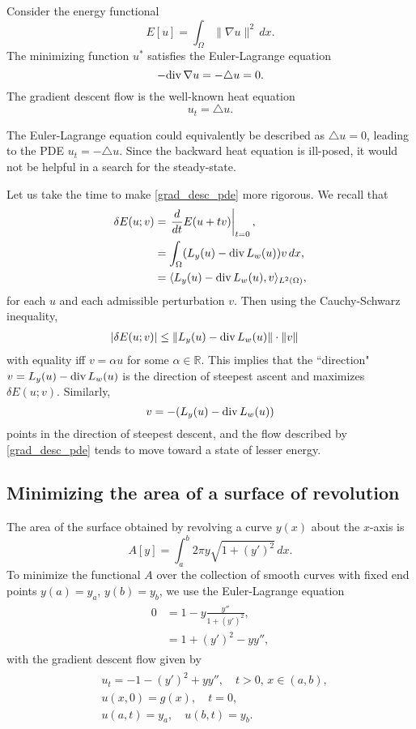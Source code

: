 \begin{example}
Consider the energy functional 
\[ E[u] = \int_{\Omega} \|\nabla u\|^2 \, dx.\]
The minimizing function $u^*$ satisfies the Euler-Lagrange equation
\[-{\rm div}\, \nabla u	= - \triangle u = 0.\]
The gradient descent flow is the well-known heat equation
\[u_t = \triangle u.\]
\end{example}

The Euler-Lagrange equation could equivalently be described as $\triangle u = 0$, leading to the PDE $u_t = -\triangle u$. 
Since the backward heat equation is ill-posed, it would not be helpful in a search for the steady-state. 

Let us take the time to make \eqref{grad_desc_pde} more rigorous. 
We recall that 
\begin{align*}
		\delta E(u;v) &= \left.\frac{d}{dt}E(u + tv)\right|_{t=0},\\
		&= \int_{\Omega} (L_y(u) - {\rm div}\, L_w(u)) v\, dx,\\
		&= \langle L_y(u) - {\rm div}\, L_w(u), v \rangle_{L^2(\Omega)},
\end{align*}
for each $u$ and each admissible perturbation $v$.
Then using the Cauchy-Schwarz inequality,
\begin{align*}
	|\delta E(u;v)| &\leq \|L_y(u) - {\rm div}\, L_w(u)\| \cdot \| v \|
\end{align*}
with equality iff $v =\alpha u$ for some $\alpha \in \mathbb{R}$. 
This implies that the ``direction" 
$v = L_y(u) - {\rm div}\, L_w(u)$ is the direction of steepest ascent and 
maximizes $\delta E(u;v)$. 
Similarly,
\[v = -(L_y(u) - {\rm div}\, L_w(u))\]
 points in the direction of steepest descent, and the flow described by \eqref{grad_desc_pde} tends to move toward a state of lesser energy. 


\subsection*{Minimizing the area of a surface of revolution}
The area of the surface obtained by revolving a curve $y(x)$ about the $x$-axis is 
\[A[y] = \int_a^b 2 \pi y \sqrt{1 + (y')^2} \, dx.
\]
To minimize the functional $A$ over the collection of smooth curves with fixed end points $y(a) = y_a$, $y(b) = y_b$, we use the Euler-Lagrange equation 
\begin{align}
	\begin{split}
	0 &= 1 - y \frac{y''}{1 + (y')^2} , \\
	&= 1 + (y')^2 - y y'',
	\end{split}\label{tv_images:SA_EL_equation}
\end{align}
with the gradient descent flow given by 
\begin{align}
	\begin{split}
	&{ } u_t = -1 - (y')^2 + y y'',\quad t > 0,\, x \in (a,b), \\
	&{ } u(x,0) = g(x), \quad t = 0,\\
	&{ } u(a,t) = y_a, \quad u(b,t) = y_b.
	\end{split}\label{tv_images:SA_flow}
\end{align}

